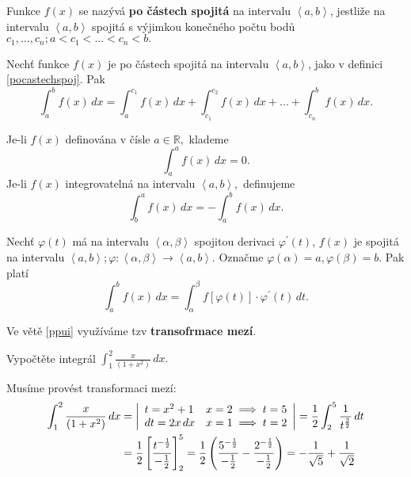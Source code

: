 \begin{definition}\label{pocastechspoj}
Funkce $f(x)$ se nazývá \textbf{po částech spojitá} na intervalu $\left < a,b \right > $,
jestliže na intervalu $\left < a,b \right > $ spojitá s výjimkou konečného počtu
bodů $c_1,\dots,c_n; a<c_1<\dots<c_n<b.$
\end{definition}

\begin{veta}
Nechť funkce $f(x)$ je po částech spojitá na intervalu $\left < a,b \right > $, jako
v definici \ref{pocastechspoj}. Pak
$$\int_a^b f(x)\, dx = \int_a^{c_1}f(x)\, dx + \int_{c_1}^{c_2}f(x)\, dx + \dots + \int_{c_n}^b f(x)\, dx.$$
\end{veta}

\begin{definition}
Je-li $f(x)$ definována v čísle $a \in \mathbb R,$ klademe
$$\int _a ^a f(x)\, dx = 0.$$
Je-li $f(x)$ integrovatelná na intervalu $\left < a,b \right > ,$ definujeme
$$\int_b^a f(x)\, dx = -\int_a^b f(x)\, dx.$$
\end{definition}


\begin{veta}\label{ppui}
Nechť $\varphi (t)$ má na intervalu $\left < \alpha, \beta  \right > $ spojitou derivaci
$\varphi^\prime (t)$, $f(x)$ je spojitá na intervalu $\left < a,b \right >;
\varphi: \left < \alpha, \beta \right >\to \left < a,b \right >  $. Označme
$\varphi(\alpha)=a, \varphi(\beta)=b.$ Pak platí
$$\int _a ^b f(x)\, dx = \int _\alpha ^\beta f \left [ \varphi(t) \right ]\cdot \varphi^\prime (t)\, dt. $$
\end{veta}

\begin{pozn}
    Ve větě \ref{ppui} využíváme tzv \textbf{transofrmace mezí}.
\end{pozn}

\begin{priklad}
Vypočtěte integrál $\int _1^2 \frac{x}{(1+x^2)}\, dx.$
\end{priklad}

\begin{reseni}
Musíme provést transformaci mezí:
\begin{align*}
\int _1^2 \frac{x}{(1+x^2)}\, dx &= \left |\begin{array}{l l}
    t=x^2+1 & x=2\implies t=5 \\
    dt = 2x \, dx & x=1\implies t=2
\end{array}\right | = \frac{1}{2}\int _2^5 \frac{1}{t^{\frac{3}{2}}}\, dt \\
&= \frac{1}{2}\left [ \frac{t^{-\frac{1}{2}}}{-\frac{1}{2}} \right ] _2^5 = \frac{1}{2}\left ( \frac{5^{-\frac{1}{2}}}{-\frac{1}{2}}-\frac{2^{-\frac{1}{2}}}{-\frac{1}{2}} \right )=-\frac{1}{\sqrt{5} }+\frac{1}{\sqrt{2} }
\end{align*}
\end{reseni}

